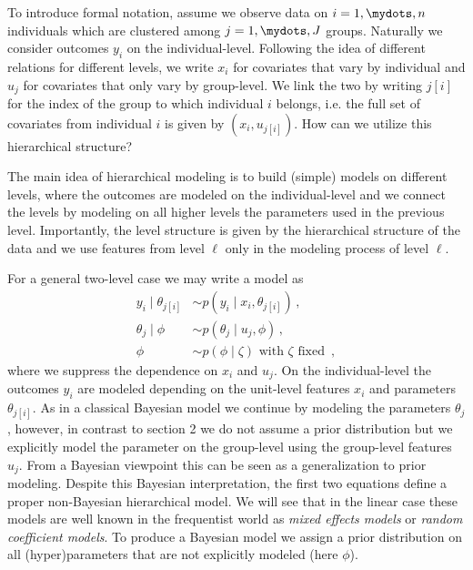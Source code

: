 \vspace{-10pt}
To introduce formal notation, assume we observe data on $i=1,\mydots,n$ individuals which are clustered among $j=1,\mydots,J$ groups.
Naturally we consider outcomes $y_i$ on the individual-level.
Following the idea of different relations for different levels, we write $x_i$ for covariates that vary by individual and $u_j$ for covariates that only vary by group-level.
We link the two by writing $j[i]$ for the index of the group to which individual $i$ belongs, i.e. the full set of covariates from individual $i$ is given by $(x_i, u_{j[i]})$.
How can we utilize this hierarchical structure?

The main idea of hierarchical modeling is to build (simple) models on different levels, where the outcomes are modeled on the individual-level and we connect the levels by modeling on all higher levels the parameters used in the previous level.
Importantly, the level structure is given by the hierarchical structure of the data and we use features from level $\ell$ only in the modeling process of level $\ell$.

For a general two-level case we may write a model as
\begin{align}
  y_i \mid \theta_{j[i]} &\sim p(y_i \mid x_i, \theta_{j[i]}) \,,\tag{Individual Level}\\
  \theta_j \mid \phi &\sim p(\theta_j \mid u_j, \phi) \,,\tag{Group Level}\\
  \phi &\sim p(\phi \mid \zeta) \text{ with } \zeta \text{ fixed } \,, \tag{Prior}
\end{align}
where we suppress the dependence on $x_i$ and $u_j$.
On the individual-level the outcomes $y_i$ are modeled depending on the unit-level features $x_i$ and parameters $\theta_{j[i]}$.
As in a classical Bayesian model we continue by modeling the parameters $\theta_j$, however, in contrast to section 2 we do not assume a prior distribution but we explicitly model the parameter on the group-level using the group-level features $u_j$.
From a Bayesian viewpoint this can be seen as a generalization to prior modeling.
Despite this Bayesian interpretation, the first two equations define a proper non-Bayesian hierarchical model.
We will see that in the linear case these models are well known in the frequentist world as \emph{mixed effects models} or \emph{random coefficient models}.
To produce a Bayesian model we assign a prior distribution on all (hyper)parameters that are not explicitly modeled (here $\phi$).

